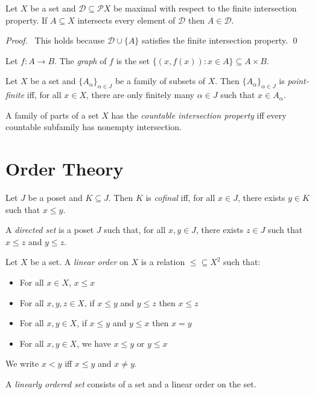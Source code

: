 \begin{lm}
  \label{lm:sets:finite_intersection_property:intersect_all}
  Let $X$ be a set and $\mathcal{D} \subseteq \mathcal{P} X$ be maximal with respect to the finite intersection property. If $A \subseteq X$ intersects every element of $\mathcal{D}$ then $A \in \mathcal{D}$.
\end{lm}

\begin{proof}
  \pf\ This holds because $\mathcal{D} \cup \{ A \}$ satisfies the finite intersection property. \qed
\end{proof}

\begin{df}[Graph]
  Let $f : A \rightarrow B$. The \emph{graph} of $f$ is the set $\{ (x, f(x))
  : x \in A \} \subseteq A \times B$.
\end{df}

 \begin{df}
 Let $X$ be a set and $\{ A_\alpha \}_{\alpha \in J}$ be a family of subsets
 of $X$. Then $\{ A_\alpha \}_{\alpha \in J}$ is \emph{point-finite} iff, for
all $x \in X$, there are only finitely many $\alpha \in J$ such that $x \in
A_\alpha$.
\end{df}

\begin{df}
  A family of parts of a set $X$ has the \emph{countable intersection property} iff every countable subfamily has nonempty intersection.
\end{df}

\section{Order Theory}

  \begin{df}[Cofinal]
  Let $J$ be a poset and $K \subseteq J$. Then $K$ is \emph{cofinal} iff, for
all $x \in J$, there exists $y \in K$ such that $x \leq y$.
\end{df}

  \begin{df}
  A \emph{directed set} is a poset $J$ such that, for all $x, y \in J$, there
exists $z \in J$ such that $x \leq z$ and $y \leq z$.
\end{df}

\begin{df}
  Let $X$ be a set. A \emph{linear order} on $X$ is a relation $\leq
  \subseteq X^2$ such that:
  \begin{itemize}
    \item For all $x \in X$, $x \leq x$
    \item For all $x, y, z \in X$, if $x \leq y$ and $y \leq z$ then $x \leq
    z$
    \item For all $x, y \in X$, if $x \leq y$ and $y \leq x$ then $x = y$
    \item For all $x, y \in X$, we have $x \leq y$ or $y \leq x$
  \end{itemize}
  We write $x < y$ iff $x \leq y$ and $x \neq y$.

  A \emph{linearly ordered set} consists of a set and a linear order on the
  set.
\end{df}

